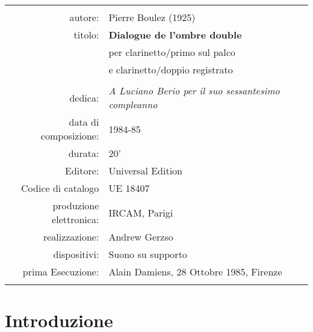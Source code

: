 \begin{table}[ht]
\begin{center}
\begin{tabular}{>{\sffamily}r>{\normalsize }p{7.5cm}}

\hline
\hline
											& \\
autore:										& Pierre Boulez (1925) \\
titolo:										& \textbf{Dialogue de l'ombre double} \\
											& \textsf{per clarinetto/primo sul palco} \\
											& \textsf{e clarinetto/doppio registrato} \\
											& \\											
dedica:										& \emph{A Luciano Berio per il suo sessantesimo compleanno} \\
data di composizione:						& 1984-85 \\
durata:										& 20' \\
Editore:									& Universal Edition \\
Codice di catalogo							& UE 18407 \\
produzione elettronica:						& IRCAM, Parigi \\
realizzazione:								& Andrew Gerzso \\
dispositivi:								& Suono su supporto \\
prima Esecuzione:							& Alain Damiens, 28 Ottobre 1985, Firenze \\
											& \\
\hline
\hline

\end{tabular}
\end{center}
\end{table}%



\section*{Introduzione}

